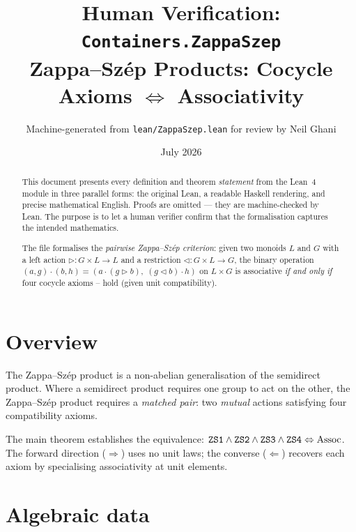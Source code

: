\documentclass[11pt,a4paper]{article}
\title{Human Verification: \texttt{Containers.ZappaSzep}\\[4pt]
  \large Zappa--Sz\'{e}p Products: Cocycle Axioms $\Leftrightarrow$ Associativity}
\author{Machine-generated from \texttt{lean/ZappaSzep.lean} for review by Neil Ghani}
\date{July 2026}
\begin{document}
\maketitle

\begin{abstract}
This document presents every definition and theorem \emph{statement} from the
Lean~4 module  in three parallel forms: the original
Lean, a readable Haskell rendering, and precise mathematical English.  Proofs
are omitted --- they are machine-checked by Lean.  The purpose is to let a
human verifier confirm that the formalisation captures the intended
mathematics.

The file formalises the \emph{pairwise Zappa--Sz\'{e}p criterion}: given two
monoids $L$ and $G$ with a left action $\triangleright : G \times L \to L$ and a
restriction $\triangleleft : G \times L \to G$, the binary operation
$(a,g) \cdot (b,h) = (a \cdot (g \triangleright b),\; (g \triangleleft b) \cdot h)$
on $L \times G$ is associative \emph{if and only if} four cocycle axioms
-- hold (given unit compatibility).
\end{abstract}

\tableofcontents
\bigskip

\section{Overview}

The Zappa--Sz\'{e}p product is a non-abelian generalisation of the semidirect
product.  Where a semidirect product requires one group to act on the other, the
Zappa--Sz\'{e}p product requires a \emph{matched pair}: two \emph{mutual} actions
satisfying four compatibility axioms.

The main theorem establishes the equivalence:
$\texttt{ZS1} \wedge \texttt{ZS2} \wedge \texttt{ZS3} \wedge \texttt{ZS4}
\Leftrightarrow \mathrm{Assoc}$.
The forward direction ($\Rightarrow$) uses no unit laws; the converse
($\Leftarrow$) recovers each axiom by specialising associativity at unit elements.

\section{Algebraic data}
\end{document}
